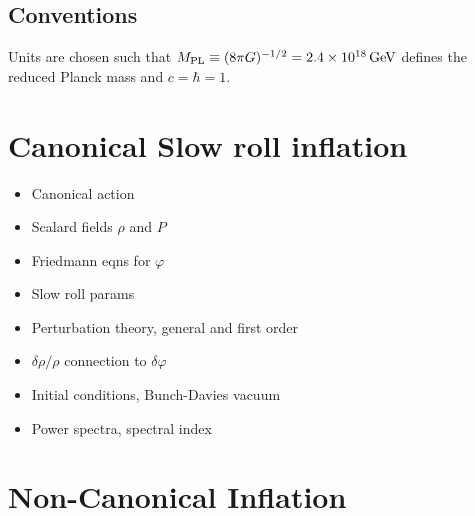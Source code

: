 \subsection{Conventions}
\label{sec:conventions}
Units are chosen such that $M_{\mathrm{PL}} \equiv (8\pi G )^{-1/2}= 2 
.4 \times 10^{18}\, {\rm GeV}$ 
defines the reduced Planck mass and $c=\hbar =1$. 


\section{Canonical Slow roll inflation}
\label{sec:slowroll-intro}
\begin{itemize}
 \item Canonical action
 \item Scalard fields $\rho$ and $P$
 \item Friedmann eqns for $\varphi$
 \item Slow roll params
 \item Perturbation theory, general and first order
 \item $\delta\rho/\rho$ connection to $\delta \varphi$
 \item Initial conditions, Bunch-Davies vacuum
 \item  Power spectra, spectral index
\end{itemize}


\section{Non-Canonical Inflation} 
\label{sec:noncanoninfl}


